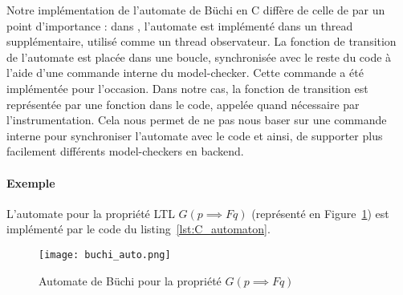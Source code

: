 Notre implémentation de l'automate de Büchi en C diffère de celle de
\cite{morse_ltl} par un point d'importance : dans \cite{morse_ltl}, l'automate
est implémenté dans un thread supplémentaire, utilisé comme un thread
observateur. La fonction de transition de l'automate est placée dans une boucle,
synchronisée avec le reste du code à l'aide d'une commande interne du
model-checker. Cette commande a été implémentée pour l'occasion. Dans notre cas,
la fonction de transition est représentée par une fonction dans le code, appelée
quand nécessaire par l'instrumentation. Cela nous permet de ne pas nous baser sur
une commande interne pour synchroniser l'automate avec le code et ainsi, de
supporter plus facilement différents model-checkers en backend.

\paragraph{Exemple}
L'automate pour la propriété LTL \(G (p \implies F q)\) (représenté en
Figure~\ref{fig:buchi_auto}) est implémenté par
le code du listing~\ref{lst:C_automaton}.

\begin{figure}[h!]
\begin{center}
  \texttt{[image: buchi\_auto.png]}
\end{center}
\caption{Automate de Büchi pour la propriété \(G (p \implies F q)\)}
\label{fig:buchi_auto}
\end{figure}

